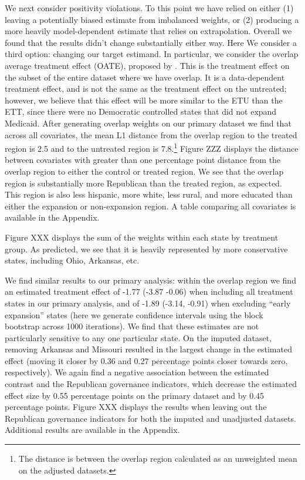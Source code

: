 \documentclass[12pt]{article}
\begin{document}
We next consider positivity violations. To this point we have relied on either (1) leaving a potentially biased estimate from imbalanced weights, or (2) producing a more heavily model-dependent estimate that relies on extrapolation. Overall we found that the results didn't change substantially either way. Here We consider a third option: changing our target estimand. In particular, we consider the overlap average treatment effect (OATE), proposed by \cite{li2018balancing}. This is the treatment effect on the subset of the entire dataset where we have overlap. It is a data-dependent treatment effect, and is not the same as the treatment effect on the untreated; however, we believe that this effect will be more similar to the ETU than the ETT, since there were no Democratic controlled states that did not expand Medicaid. After generating overlap weights on our primary dataset we find that across all covariates, the mean L1 distance from the overlap region to the treated region is 2.5 and to the untreated region is 7.8.\footnote{The distance is between the overlap region calculated as an unweighted mean on the adjusted datasets.} Figure ZZZ displays the distance between covariates with greater than one percentage point distance from the overlap region to either the control or treated region. We see that the overlap region is substantially more Republican than the treated region, as expected. This region is also less hispanic, more white, less rural, and more educated than either the expansion or non-expansion region. A table comparing all covariates is available in the Appendix.

Figure XXX displays the sum of the weights within each state by treatment group. As predicted, we see that it is heavily represented by more conservative states, including Ohio, Arkansas, etc.

We find similar results to our primary analysis: within the overlap region we find an estimated treatment effect of -1.77 (-3.87 -0.06) when including all treatment states in our primary analysis, and of -1.89 (-3.14, -0.91) when excluding ``early expansion'' states (here we generate confidence intervals using the block bootstrap across 1000 iterations). We find that these estimates are not particularly sensitive to any one particular state. On the imputed dataset, removing Arkansas and Missouri resulted in the largest change in the estimated effect (moving it closer by 0.36 and 0.27 percentage points closer towards zero, respectively). We again find a negative association between the estimated contrast and the Republican governance indicators, which decrease the estimated effect size by 0.55 percentage points on the primary dataset and by 0.45 percentage points. Figure XXX displays the results when leaving out the Republican governance indicators for both the imputed and unadjusted datasets. Additional results are available in the Appendix.
\end{document}

